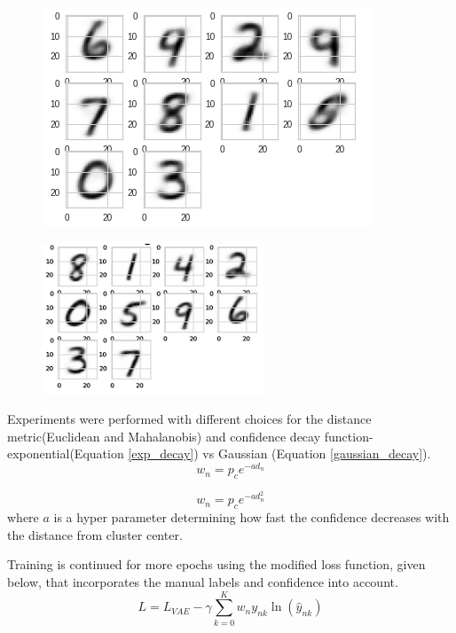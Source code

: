 \documentclass[runningheads]{llncs}
\begin{document}
\begin{figure}[!t]
\centering
\begin{minipage}{.5\textwidth}
  \centering
  \includegraphics[width=.5\linewidth]{cluster_centers_epoch_1_0_gmm.png} \\
  \label{cluster_center_1}
\end{minipage}%
\begin{minipage}{.5\textwidth}
  \centering
  \includegraphics[width=.5\linewidth]{cluster_centers_epoch_5_0_gmm.png} \\
  \label{cluster_center_5}
\end{minipage}
\end{figure}

Experiments were performed with different choices for the distance metric(Euclidean and Mahalanobis) and confidence decay function- exponential(Equation \ref{exp_decay}) vs Gaussian (Equation \ref{gaussian_decay}).
\begin{equation}
    w_n = p_ce^{-a d_n}
    \label{exp_decay}
\end{equation}

\begin{equation}
    w_n = p_ce^{-a d_n^2}
    \label{gaussian_decay}
\end{equation}
where $a$ is a hyper parameter determining how fast the confidence decreases with the distance from cluster center.


Training is continued for more epochs using the modified loss function, given below, that incorporates the manual labels and confidence into account.
\begin{equation} \label{semi_supervised_loss}
L = L_{VAE}  - \gamma \sum_{k=0}^{K}w_{n}y_{nk}\ln(\hat{y}_{nk})
\end{equation}
\end{document}
